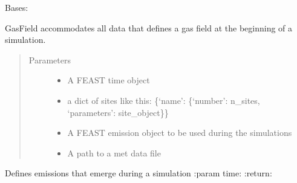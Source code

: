 \documentclass[letterpaper,10pt,english]{sphinxmanual}
\begin{document}

\begin{fulllineitems}
\label{\detokenize{index:feast.EmissionSimModules.infrastructure_classes.GasField}}
Bases: 

GasField accommodates all data that defines a gas field at the beginning of a simulation.
\begin{quote}\begin{description}
\item[{Parameters}] \leavevmode\begin{itemize}
\item {} 
 \textendash{} A FEAST time object

\item {} 
 \textendash{} a dict of sites like this: \{‘name’: \{‘number’: n\_sites, ‘parameters’: site\_object\}\}

\item {} 
 \textendash{} A FEAST emission object to be used during the simulations

\item {} 
 \textendash{} A path to a met data file

\end{itemize}

\end{description}\end{quote}

\begin{fulllineitems}
\label{\detokenize{index:feast.EmissionSimModules.infrastructure_classes.GasField.emerging_emissions}}
Defines emissions that emerge during a simulation
:param time:
:return:

\end{fulllineitems}


\end{fulllineitems}
\end{document}
